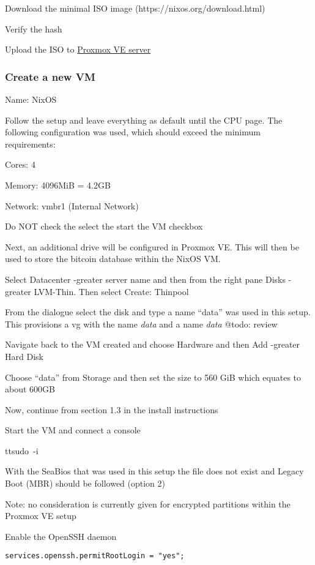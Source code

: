 Download the minimal ISO image (https://nixos.org/download.html)

Verify the hash

Upload the ISO to
\protect\hyperlink{ux5cux23ux5cux23Upload-the-ISO-image-to-the-Proxmox-VE-server}{Proxmox
VE server}

\hypertarget{create-a-new-vm}{%
\subsubsection{Create a new VM}\label{create-a-new-vm}}

Name: NixOS

Follow the setup and leave everything as default until the CPU page. The
following configuration was used, which should exceed the minimum
requirements:

Cores: 4

Memory: 4096MiB = 4.2GB

Network: vmbr1 (Internal Network)

Do NOT check the select the start the VM checkbox

Next, an additional drive will be configured in Proxmox VE. This will
then be used to store the bitcoin database within the NixOS VM.

Select Datacenter -greater{} server name and then from the right
pane Disks -greater{} LVM-Thin. Then select Create: Thinpool

From the dialogue select the disk and type a name ``data'' was used in
this setup. This provisions a vg with the name \emph{data} and a name
\emph{data} @todo: review

Navigate back to the VM created and choose Hardware and then Add
-greater{} Hard Disk

Choose ``data'' from Storage and then set the size to 560 GiB which
equates to about 600GB

Now, continue from section 1.3 in the install instructions

Start the VM and connect a console

tt{sudo\ -i}

With the SeaBios that was used in this setup the file does not exist and
Legacy Boot (MBR) should be followed (option 2)

Note: no consideration is currently given for encrypted partitions
within the Proxmox VE setup

Enable the OpenSSH daemon

\begin{verbatim}
services.openssh.permitRootLogin = "yes";
\end{verbatim}

